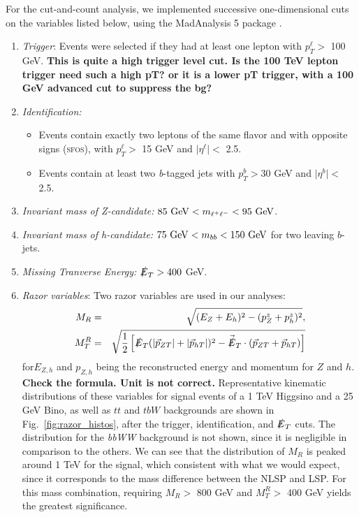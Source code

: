 \documentclass[a4paper,11pt]{article}
\providecommand{\tightlist}{%
     \setlength{\itemsep}{0pt}\setlength{\parskip}{0pt}}
\newcommand{\Shufang}[1]{{\bf\color{Maroon}  #1}}
\newcommand{\met}{{\slashed{E}_T}}
\begin{document}
For the cut-and-count analysis, we implemented successive one-dimensional cuts
on the variables listed below, using the MadAnalysis 5 package
\citep{Conte:2012fm}.

\begin{enumerate}
  \tightlist
  \item \emph{Trigger}: Events were selected if they had at least one lepton
    with $p_{T}^\ell >$ 100 GeV.  \Shufang{This is quite a high trigger level cut.  Is the 100 TeV lepton trigger need such a high pT? or it is a lower pT trigger, with a 100 GeV advanced cut to suppress the bg?}

  \item \emph{Identification:}

    \begin{itemize}
      \item Events contain exactly two leptons of the same flavor
        and with opposite signs (\textsc{sfos}), with $p_{T}^\ell >$ 15 GeV and
        $\vert\eta^\ell\vert <$ 2.5.
      \item Events contain at least two \emph{b}-tagged jets with
        $p_{T}^b > 30$ GeV and $\vert\eta^b\vert <$ 2.5.
    \end{itemize}

  \item \emph{Invariant mass of Z-candidate:}  $85\ {\rm GeV}<m_{\ell^{+}\ell^{-}}<95\ {\rm GeV}$.

  \item \emph{Invariant mass of h-candidate:} $75\ {\rm GeV}<m_{bb}<150\ {\rm GeV}$ for two leaving $b$-jets.

  \item \emph{Missing Tranverse Energy:}  $\met> 400$ GeV.

  \item \emph{Razor variables}:  Two razor variables are used in our analyses: 
\begin{align}
M_R &=& \sqrt{(E_Z+E_h)^2 - (p_Z^z + p_h^z)^2},\\
M_T^R &=& \sqrt{\frac{1}{2}\left[\slashed{E}_T(|\vec{p}_{ZT}|+|\vec{p}_{hT}|)^2
- \vec{\slashed{E}}_T\cdot(\vec{p}_{ZT}+\vec{p}_{hT})\right]}
\end{align}
 for$E_{Z,h}$ and $p_{Z,h}$ being the reconstructed energy and momentum for $Z$ and $h$.
\Shufang{Check the formula.  Unit is not correct.}
    Representative kinematic
  distributions of these variables for signal events of a 1 TeV Higgsino and a 25 GeV Bino, as well as $tt$ and $tbW$ backgrounds are
  shown in Fig.~\ref{fig:razor_histos}, after the trigger, identification, and
  $\slashed{E}_{T}$ cuts. The
  distribution for the \emph{bbWW} background is not shown, since it is negligible in
  comparison to the others.   We can see that the distribution of $M_R$ is peaked
  around 1 TeV for the signal, which consistent with what we would expect, since
  it corresponds to the mass difference between the NLSP and LSP.  For this mass combination, requiring $M_R >$ 800
  GeV and $M_T^R >$ 400 GeV yields the greatest significance.

\end{enumerate}
\end{document}
